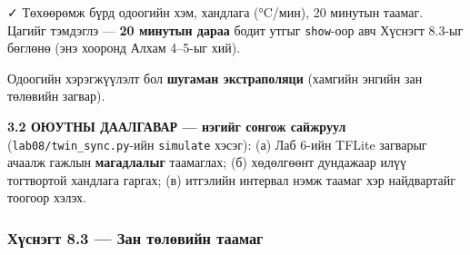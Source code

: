 ✓ Төхөөрөмж бүрд одоогийн хэм, хандлага (°C/мин), 20 минутын таамаг. Цагийг тэмдэглэ --- \textbf{20 минутын дараа} бодит утгыг \texttt{show}-оор авч Хүснэгт 8.3-ыг бөглөнө (энэ хооронд Алхам 4--5-ыг хий).

Одоогийн хэрэгжүүлэлт бол \textbf{шугаман экстраполяци} (хамгийн энгийн зан төлөвийн загвар).

\textbf{3.2 ОЮУТНЫ ДААЛГАВАР --- нэгийг сонгож сайжруул} (\texttt{lab08/\allowbreak{}twin\_\allowbreak{}sync.\allowbreak{}py}-ийн \texttt{simulate} хэсэг): (а) Лаб 6-ийн TFLite загварыг ачаалж гажлын \textbf{магадлалыг} таамаглах; (б) хөдөлгөөнт дундажаар илүү тогтвортой хандлага гаргах; (в) итгэлийн интервал нэмж таамаг хэр найдвартайг тоогоор хэлэх.

\hypertarget{ux445ux4afux441ux43dux44dux433ux442-8.3-ux437ux430ux43d-ux442ux4e9ux43bux4e9ux432ux438ux439ux43d-ux442ux430ux430ux43cux430ux433}{%
\subsubsection{Хүснэгт 8.3 --- Зан төлөвийн таамаг}\label{ux445ux4afux441ux43dux44dux433ux442-8.3-ux437ux430ux43d-ux442ux4e9ux43bux4e9ux432ux438ux439ux43d-ux442ux430ux430ux43cux430ux433}}

